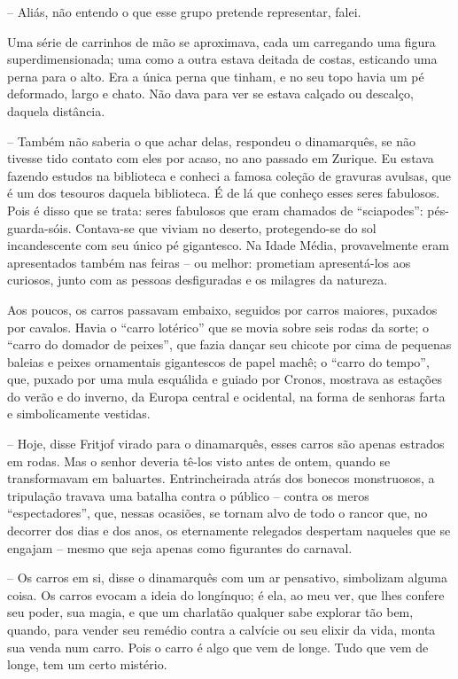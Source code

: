 -- Aliás, não entendo o que esse grupo pretende representar, falei.

Uma série de carrinhos de mão se aproximava, cada um carregando uma
figura superdimensionada; uma como a outra estava deitada de costas,
esticando uma perna para o alto. Era a única perna que tinham, e no seu
topo havia um pé deformado, largo e chato. Não dava para ver se estava
calçado ou descalço, daquela distância.

-- Também não saberia o que achar delas, respondeu o dinamarquês, se não
tivesse tido contato com eles por acaso, no ano passado em Zurique. Eu
estava fazendo estudos na biblioteca e conheci a famosa coleção de
gravuras avulsas, que é um dos tesouros daquela biblioteca. É de lá que
conheço esses seres fabulosos. Pois é disso que se trata: seres
fabulosos que eram chamados de ``sciapodes'': pés-guarda-sóis.
Contava-se que viviam no deserto, protegendo-se do sol incandescente com
seu único pé gigantesco. Na Idade Média, provavelmente eram apresentados
também nas feiras -- ou melhor: prometiam apresentá-los aos curiosos,
junto com as pessoas desfiguradas e os milagres da natureza.

Aos poucos, os carros passavam embaixo, seguidos por carros maiores,
puxados por cavalos. Havia o ``carro lotérico'' que se movia sobre seis
rodas da sorte; o ``carro do domador de peixes'', que fazia dançar seu
chicote por cima de pequenas baleias e peixes ornamentais gigantescos de
papel machê; o ``carro do tempo'', que, puxado por uma mula esquálida e
guiado por Cronos, mostrava as estações do verão e do inverno, da Europa
central e ocidental, na forma de senhoras farta e simbolicamente
vestidas.

-- Hoje, disse Fritjof virado para o dinamarquês, esses carros são
apenas estrados em rodas. Mas o senhor deveria tê-los visto antes de
ontem, quando se transformavam em baluartes. Entrincheirada atrás dos
bonecos monstruosos, a tripulação travava uma batalha contra o público
-- contra os meros ``espectadores'', que, nessas ocasiões, se tornam
alvo de todo o rancor que, no decorrer dos dias e dos anos, os
eternamente relegados despertam naqueles que se engajam -- mesmo que
seja apenas como figurantes do carnaval.

-- Os carros em si, disse o dinamarquês com um ar pensativo, simbolizam
alguma coisa. Os carros evocam a ideia do longínquo; é ela, ao meu ver,
que lhes confere seu poder, sua magia, e que um charlatão qualquer sabe
explorar tão bem, quando, para vender seu remédio contra a calvície ou
seu elixir da vida, monta sua venda num carro. Pois o carro é algo que
vem de longe. Tudo que vem de longe, tem um certo mistério.

